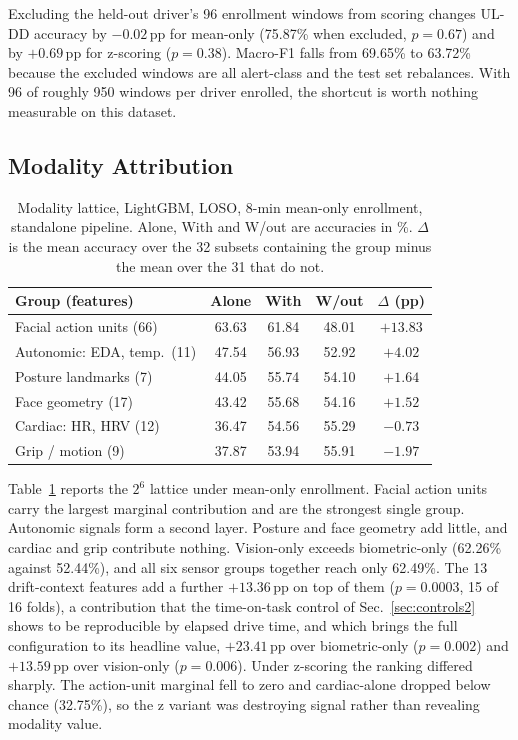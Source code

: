 \documentclass[journal]{IEEEtran}
\newcommand{\pp}{\,pp}
\begin{document}
Excluding the held-out driver's 96 enrollment windows from scoring changes
UL-DD accuracy by $-0.02$\pp{} for mean-only (75.87\% when excluded,
$p=0.67$) and by $+0.69$\pp{} for z-scoring ($p=0.38$). Macro-F1 falls from
69.65\% to 63.72\% because the excluded windows are all alert-class and the
test set rebalances. With 96 of roughly 950 windows per driver enrolled, the
shortcut is worth nothing measurable on this dataset.

\subsection{Modality Attribution}
\begin{table}[!t]
\caption{Modality lattice, LightGBM, LOSO, 8-min mean-only enrollment,
standalone pipeline. Alone, With and W/out are accuracies in \%. $\Delta$ is
the mean accuracy over the 32 subsets containing the group minus the mean over
the 31 that do not.}
\label{tab:lattice}
\centering\footnotesize
\setlength{\tabcolsep}{3pt}
\begin{tabular}{@{}lcccc@{}}
\toprule
Group (features) & Alone & With & W/out & $\Delta$ (pp) \\
\midrule
Facial action units (66)      & 63.63 & 61.84 & 48.01 & $+13.83$ \\
Autonomic: EDA, temp.\ (11)   & 47.54 & 56.93 & 52.92 & $+4.02$ \\
Posture landmarks (7)         & 44.05 & 55.74 & 54.10 & $+1.64$ \\
Face geometry (17)            & 43.42 & 55.68 & 54.16 & $+1.52$ \\
Cardiac: HR, HRV (12)         & 36.47 & 54.56 & 55.29 & $-0.73$ \\
Grip / motion (9)             & 37.87 & 53.94 & 55.91 & $-1.97$ \\
\bottomrule
\end{tabular}
\end{table}

Table~\ref{tab:lattice} reports the $2^{6}$ lattice under mean-only
enrollment. Facial action units carry the largest marginal contribution and
are the strongest single group. Autonomic signals form a second layer. Posture
and face geometry add little, and cardiac and grip contribute nothing.
Vision-only exceeds biometric-only (62.26\% against 52.44\%), and all six
sensor groups together reach only 62.49\%. The 13 drift-context features add
a further $+13.36$\pp{} on top of them ($p=0.0003$, 15 of 16 folds), a
contribution that the time-on-task control of Sec.~\ref{sec:controls2} shows
to be reproducible by elapsed drive time, and which brings the full
configuration to its headline value, $+23.41$\pp{} over
biometric-only ($p=0.002$) and $+13.59$\pp{} over vision-only ($p=0.006$).
Under z-scoring the ranking differed sharply. The action-unit marginal fell to
zero and cardiac-alone dropped below chance (32.75\%), so the z variant was
destroying signal rather than revealing modality value.
\end{document}
